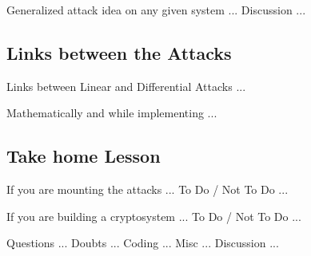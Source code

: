 \documentclass[9pt]{beamer}
\begin{document}
\begin{frame}
Generalized attack idea on any given system ... Discussion ...

\end{frame}

\subsection{Links between the Attacks}
\begin{frame}
Links between Linear and Differential Attacks ... 

\end{frame}

\begin{frame}
Mathematically and while implementing ...

\end{frame}

\subsection{Take home Lesson}
\begin{frame}
If you are mounting the attacks ... To Do / Not To Do ...

\end{frame}

\begin{frame}
If you are building a cryptosystem ... To Do / Not To Do ...

\end{frame}

\begin{frame}
Questions ... Doubts ... Coding ... Misc ... Discussion ...

\end{frame}
\end{document}

